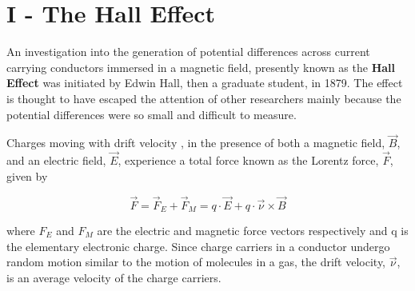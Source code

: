 \section{I - The Hall Effect}
An investigation into the generation of potential differences across current carrying conductors immersed in a magnetic field, presently known as the {\bf Hall Effect} was initiated by Edwin Hall, then a graduate student, in 1879. The effect is thought to have escaped the attention of other researchers mainly because the potential differences were so small and difficult to measure.

Charges moving with drift velocity , in the presence of both a magnetic field, $\vec{B}$, and an electric field, $\vec{E}$, experience a total force known as the Lorentz force, $\vec{F}$, given by 

\begin{equation}
\vec{F}=\vec{F}_E+\vec{F}_M=q\cdot \vec{E}+q\cdot \vec{\nu}\times \vec{B}
\label{equ:he1}
\end{equation}

\noindent where $F_E$ and $F_M$ are the electric and magnetic force vectors respectively and q is the elementary electronic charge. Since charge carriers in a conductor undergo random motion similar to the motion of molecules in a gas, the drift velocity, $\vec{\nu}$, is an average velocity of the charge carriers.

